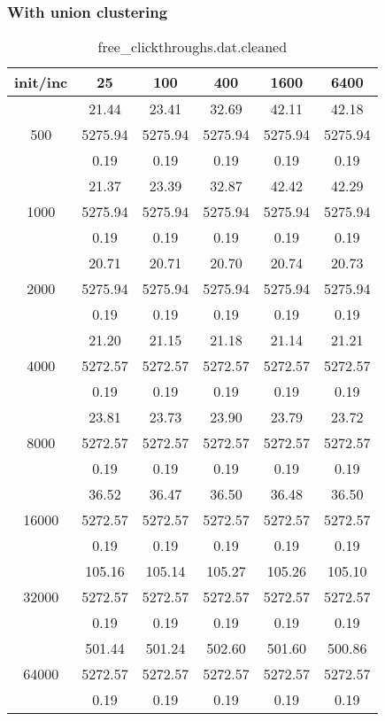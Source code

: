\subsubsection{With union clustering}
\begin{table}[th]
\caption{free\_clickthroughs.dat.cleaned}
\label{tab:free_clickthroughs.dat.cleaned}
\centering
\begin{tabular}{|c||c|c|c|c|c|}
\hline
init/inc & 25 & 100 & 400 & 1600 & 6400 \\ \hline \hline
  & 21.44 & 23.41 & 32.69 & 42.11 & 42.18\\ 
500  & 5275.94 & 5275.94 & 5275.94 & 5275.94 & 5275.94\\ 
  & 0.19 & 0.19 & 0.19 & 0.19 & 0.19\\ \hline 
  & 21.37 & 23.39 & 32.87 & 42.42 & 42.29\\ 
1000  & 5275.94 & 5275.94 & 5275.94 & 5275.94 & 5275.94\\ 
  & 0.19 & 0.19 & 0.19 & 0.19 & 0.19\\ \hline 
  & 20.71 & 20.71 & 20.70 & 20.74 & 20.73\\ 
2000  & 5275.94 & 5275.94 & 5275.94 & 5275.94 & 5275.94\\ 
  & 0.19 & 0.19 & 0.19 & 0.19 & 0.19\\ \hline 
  & 21.20 & 21.15 & 21.18 & 21.14 & 21.21\\ 
4000  & 5272.57 & 5272.57 & 5272.57 & 5272.57 & 5272.57\\ 
  & 0.19 & 0.19 & 0.19 & 0.19 & 0.19\\ \hline 
  & 23.81 & 23.73 & 23.90 & 23.79 & 23.72\\ 
8000  & 5272.57 & 5272.57 & 5272.57 & 5272.57 & 5272.57\\ 
  & 0.19 & 0.19 & 0.19 & 0.19 & 0.19\\ \hline 
  & 36.52 & 36.47 & 36.50 & 36.48 & 36.50\\ 
16000  & 5272.57 & 5272.57 & 5272.57 & 5272.57 & 5272.57\\ 
  & 0.19 & 0.19 & 0.19 & 0.19 & 0.19\\ \hline 
  & 105.16 & 105.14 & 105.27 & 105.26 & 105.10\\ 
32000  & 5272.57 & 5272.57 & 5272.57 & 5272.57 & 5272.57\\ 
  & 0.19 & 0.19 & 0.19 & 0.19 & 0.19\\ \hline 
  & 501.44 & 501.24 & 502.60 & 501.60 & 500.86\\ 
64000  & 5272.57 & 5272.57 & 5272.57 & 5272.57 & 5272.57\\ 
  & 0.19 & 0.19 & 0.19 & 0.19 & 0.19\\ \hline 
\end{tabular}
\end{table}

